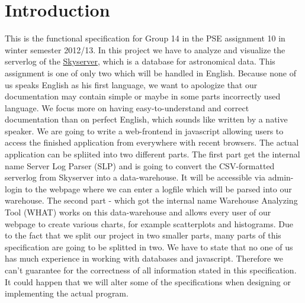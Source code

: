 \section*{Introduction}
This is the functional specification for Group 14 in the PSE assignment 10 
in winter semester 2012/13. 
In this project we have to analyze and visualize the serverlog of the 
\href{http://skyserver.sdss.org/public/en/}{Skyserver}, 
which is a database for astronomical data. %
This assignment is one of only two which will be handled %
in English.
Because none of us speaks English as his first language, 
we want to apologize that our documentation may contain simple 
or maybe in some parts incorrectly used language. We focus more on 
having easy-to-understand and correct documentation 
than on perfect English, which sounds like written by a native speaker.
\newline\newline
We are going to write a web-frontend in javascript allowing users 
to access the finished application from everywhere
with recent browsers. The actual application can be spliited into two 
different parts. The first part get the internal name
Server Log Parser (SLP) and is going to convert the CSV-formatted 
serverlog from Skyserver into a data-warehouse. It will
be accessible via admin-login to the webpage where we can enter a 
logfile which will be parsed into our warehouse. %
The second part - which got the internal name Warehouse Analyzing 
Tool (WHAT) works on this data-warehouse 
and allows every user of our webpage to create various charts, 
for example scatterplots and histograms.
Due to the fact that we split our project in two smaller parts, 
many parts of this specification are going to be splitted in two.
\newline
\newline
We have to state that no one of us has much experience in working 
with databases and javascript.
Therefore we can't guarantee for the correctness of all information 
stated in this specification.
It could happen that we will alter some of the specifications when designing or 
implementing the actual program. %

